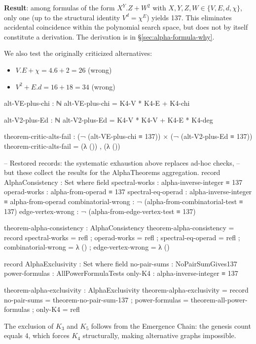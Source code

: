 \documentclass[11pt,a4paper]{book}
\def\cdot{.}%
\begin{document}
\noindent\textbf{Result}: among formulas of the form
$X^Y \cdot Z + W^2$ with $X, Y, Z, W \in \{V, E, d, \chi\}$,
only one (up to the structural identity $V^d = \chi^E$)
yields 137. This eliminates accidental coincidence within the polynomial search
space, but does not by itself constitute a derivation. The derivation is in
\S\ref{sec:alpha-formula-why}.

We also test the originally criticized alternatives:
\begin{itemize}
\item $V \cdot E + \chi = 4 \cdot 6 + 2 = 26$ \quad (wrong)
\item $V^2 + E \cdot d = 16 + 18 = 34$ \quad (wrong)
\end{itemize}

\begin{code}
alt-VE-plus-chi : ℕ
alt-VE-plus-chi = K4-V * K4-E + K4-chi

alt-V2-plus-Ed : ℕ
alt-V2-plus-Ed = K4-V * K4-V + K4-E * K4-deg

theorem-critic-alts-fail : (¬ (alt-VE-plus-chi ≡ 137)) × (¬ (alt-V2-plus-Ed ≡ 137))
theorem-critic-alts-fail = (λ ()) , (λ ())

-- Restored records: the systematic exhaustion above replaces ad-hoc checks,
-- but these collect the results for the AlphaTheorems aggregation.
record AlphaConsistency : Set where
  field
    spectral-works     : alpha-inverse-integer ≡ 137
    operad-works       : alpha-from-operad ≡ 137
    spectral-eq-operad : alpha-inverse-integer ≡ alpha-from-operad
    combinatorial-wrong : ¬ (alpha-from-combinatorial-test ≡ 137)
    edge-vertex-wrong   : ¬ (alpha-from-edge-vertex-test ≡ 137)

theorem-alpha-consistency : AlphaConsistency
theorem-alpha-consistency = record
  { spectral-works     = refl
  ; operad-works       = refl
  ; spectral-eq-operad = refl
  ; combinatorial-wrong = λ ()
  ; edge-vertex-wrong   = λ ()
  }

record AlphaExclusivity : Set where
  field
    no-pair-sums   : NoPairSumGives137
    power-formulas : AllPowerFormulaTests
    only-K4        : alpha-inverse-integer ≡ 137

theorem-alpha-exclusivity : AlphaExclusivity
theorem-alpha-exclusivity = record
  { no-pair-sums   = theorem-no-pair-sum-137
  ; power-formulas = theorem-all-power-formulas
  ; only-K4        = refl
  }
\end{code}

The exclusion of $K_3$ and $K_5$ follows from the Emergence Chain: the genesis count equals 4, 
which forces $K_4$ structurally, making alternative graphs impossible.
\end{document}

